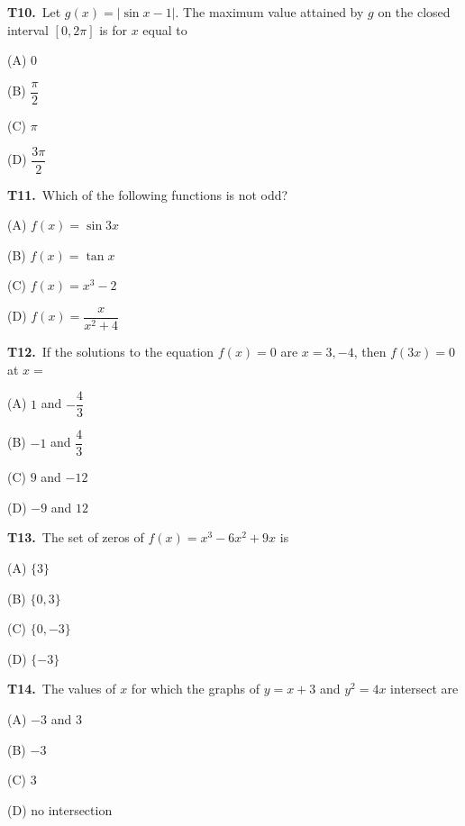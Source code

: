 \documentclass[11pt]{article}
\begin{document}
\bigskip\noindent\textbf{T10.}\ Let $g(x) = |\sin x - 1|$. The maximum value attained by $g$ on the closed interval $[0, 2\pi]$ is for $x$ equal to
\begin{list}{}{\setlength{\leftmargin}{3em}\setlength{\labelwidth}{2.5em}\setlength{\itemsep}{0pt}\setlength{\topsep}{2pt}}
\item[(A)] $0$
\item[(B)] $\dfrac{\pi}{2}$
\item[(C)] $\pi$
\item[(D)] $\dfrac{3\pi}{2}$
\end{list}

\bigskip\noindent\textbf{T11.}\ Which of the following functions is not odd?
\begin{list}{}{\setlength{\leftmargin}{3em}\setlength{\labelwidth}{2.5em}\setlength{\itemsep}{0pt}\setlength{\topsep}{2pt}}
\item[(A)] $f(x) = \sin 3x$
\item[(B)] $f(x) = \tan x$
\item[(C)] $f(x) = x^3 - 2$
\item[(D)] $f(x) = \dfrac{x}{x^2+4}$
\end{list}

\bigskip\noindent\textbf{T12.}\ If the solutions to the equation $f(x) = 0$ are $x = 3, -4$, then $f(3x) = 0$ at $x =$
\begin{list}{}{\setlength{\leftmargin}{3em}\setlength{\labelwidth}{2.5em}\setlength{\itemsep}{0pt}\setlength{\topsep}{2pt}}
\item[(A)] $1$ and $-\dfrac{4}{3}$
\item[(B)] $-1$ and $\dfrac{4}{3}$
\item[(C)] $9$ and $-12$
\item[(D)] $-9$ and $12$
\end{list}

\bigskip\noindent\textbf{T13.}\ The set of zeros of $f(x) = x^3 - 6x^2 + 9x$ is
\begin{list}{}{\setlength{\leftmargin}{3em}\setlength{\labelwidth}{2.5em}\setlength{\itemsep}{0pt}\setlength{\topsep}{2pt}}
\item[(A)] $\{3\}$
\item[(B)] $\{0,3\}$
\item[(C)] $\{0,-3\}$
\item[(D)] $\{-3\}$
\end{list}

\bigskip\noindent\textbf{T14.}\ The values of $x$ for which the graphs of $y = x + 3$ and $y^2 = 4x$ intersect are
\begin{list}{}{\setlength{\leftmargin}{3em}\setlength{\labelwidth}{2.5em}\setlength{\itemsep}{0pt}\setlength{\topsep}{2pt}}
\item[(A)] $-3$ and $3$
\item[(B)] $-3$
\item[(C)] $3$
\item[(D)] no intersection
\end{list}
\end{document}
